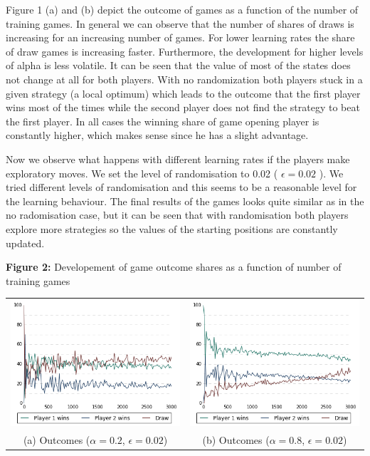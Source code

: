 \documentclass[fleqn]{article}
\begin{document}
Figure 1 (a) and (b) depict the outcome of games as a function of the number of training games. In general we can observe that the number of shares of draws is increasing for an increasing number of games. For lower learning rates the share of draw games is increasing faster. Furthermore, the development for higher levels of alpha is less volatile. 
It can be seen that the value of most of the states does not change at all for both players. With no randomization both players stuck in a given strategy (a local optimum) which leads to the outcome that the first player wins most of the times while the second player does not find the strategy to beat the first player. In all cases the winning share of game opening player is constantly higher, which makes sense since he has a slight advantage. 

Now we observe what happens with different learning rates if the players make exploratory moves. We set the level of randomisation to 0.02 ( $\epsilon = 0.02$ ). We tried different levels of randomisation and this seems to be a reasonable level for the learning behaviour. The final results of the games looks quite similar as in the no radomisation case, but it can be seen that with randomisation both players explore more strategies so the values of the starting positions are constantly updated.  

\textbf{Figure 2:} Developement of game outcome shares as a function of number of training games
\begin{center}
	\begin{tabular}{cc}
		\includegraphics[width=70mm]{alp02eps002.png} &   \includegraphics[width=70mm]{alp08eps002.png} \\
		(a) Outcomes ($\alpha=0.2$, $\epsilon=0.02$)   & (b) Outcomes ($\alpha=0.8$, $\epsilon=0.02$)   \\[4pt]
	\end{tabular}
\end{center}
\end{document}
